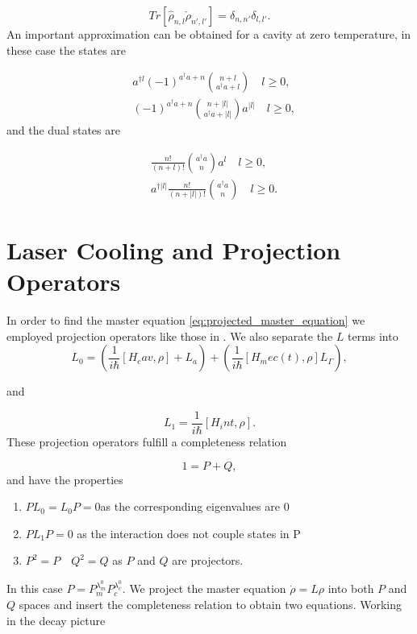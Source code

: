 \documentclass[reprint, amsmath,amssymb, aps,pra]{revtex4-1}
\begin{document}
\begin{equation}
Tr[\hat{\rho}_{n,l}\check{\rho}_{n',l'}] = \delta_{n,n'}\delta_{l,l'}.
\end{equation} An important approximation can be obtained for a cavity at zero temperature, in these case the states are \cite{EnglertDB}

\begin{align}\label{DefDBZero}
&a^{\dagger l}(-1)^{a^\dagger a + n}\binom{n+l}{a^\dagger a+l} \quad l \geq 0, \\
&(-1)^{a^\dagger a + n}\binom{n+|l|}{a^\dagger a+|l|}a^{|l|} \quad l \geq 0,
\end{align} and the dual states are

\begin{align}\label{DefDBDualZero}
&\frac{n!}{(n+l)!}\binom{a^\dagger a}{n}a^l \quad l \geq 0, \\
&a^{\dagger|l|}\frac{n!}{(n+|l|)!}\binom{a^\dagger a}{n} \quad l \geq 0.
\end{align}

\section{Laser Cooling and Projection Operators}\label{CoolingAppendix}

In order to find the master equation
\eqref{eq:projected_master_equation} we employed projection operators
like those in \cite{CarmichaelQO}. We also separate the $L$ terms into
\begin{equation}
L_0= (\frac{1}{i\hbar}[H_cav,\rho]+L_a) +(\frac{1}{i\hbar}[H_mec(t),\rho] L_\Gamma),
\end{equation}

and

\begin{equation}
L_1 = \frac{1}{i\hbar}[H_int,\rho].
\end{equation}These projection operators fulfill a completeness
relation

\begin{equation}
1 = P + Q,
\end{equation} and have the properties

\begin{enumerate}

\item $ PL_{0} = L_{0}P = 0 $\qquad as the corresponding eigenvalues are 0

\item $PL_{1}P=0$ \qquad as the interaction does not couple states in P

\item $P^2 = P \quad Q^2 = Q$ \qquad as $P$ and $Q$ are projectors.
\end{enumerate} In this case $P=P_m^{\lambda_m^0}P_c^{\lambda_c^0}$. We project the master equation $\dot{\rho}=L\rho$ into both $P$ and $Q$ spaces and insert the completeness relation to obtain two equations. Working in the decay picture
\end{document}
